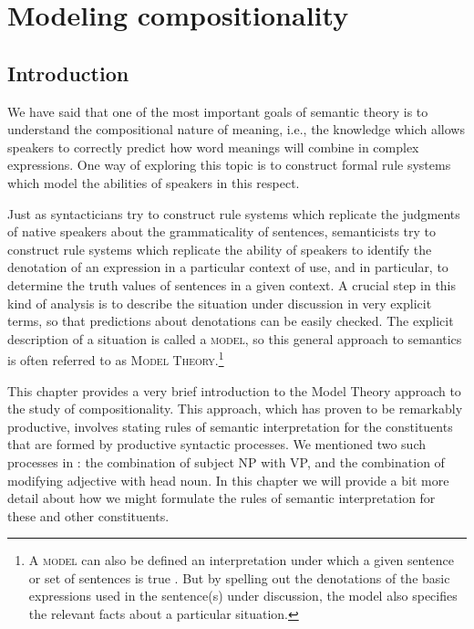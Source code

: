 \chapter{Modeling compositionality}\label{sec:13}

\section{Introduction}\label{sec:13.1}

We have said that one of the most important goals of semantic theory is to understand the compositional nature of meaning, i.e., the knowledge which allows speakers to correctly predict how word meanings will combine in complex expressions. One way of exploring this topic is to construct formal rule systems which model the abilities of speakers in this respect.



Just as syntacticians try to construct rule systems which replicate the judgments of native speakers about the grammaticality of sentences, semanticists try to construct rule systems which replicate the ability of speakers to identify the denotation of an expression in a particular context of use, and in particular, to determine the truth values of sentences in a given context. A crucial step in this kind of analysis is to describe the situation under discussion in very explicit terms, so that predictions about denotations can be easily checked. The explicit description of a situation is called a \textsc{model}, so this general approach to semantics is often referred to as \textsc{Model Theory}.\footnote{A \textsc{model} can also be defined an interpretation under which a given sentence or set of sentences is true \citep{Hodges2013}. But by spelling out the denotations of the basic expressions used in the sentence(s) under discussion, the model also specifies the relevant facts about a particular situation.}



This chapter provides a very brief introduction to the Model Theory approach to the study of compositionality. This approach, which has proven to be remarkably productive, involves stating rules of semantic interpretation for the constituents that are formed by productive syntactic processes. We mentioned two such processes in : the combination of subject NP with VP, and the combination of modifying adjective with head noun. In this chapter we will provide a bit more detail about how we might formulate the rules of semantic interpretation for these and other constituents.



